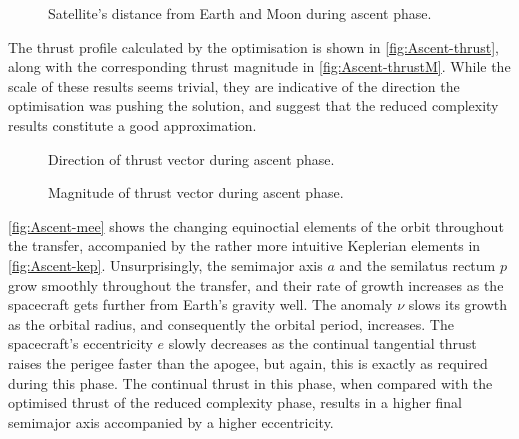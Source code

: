 \begin{figure}
\centering
\def\svgwidth{\figurewidth}

\caption{Satellite's distance from Earth and Moon during ascent phase.} \label{fig:Ascent-dist}
\end{figure}

%
%

The thrust profile calculated by the optimisation is shown in \autoref{fig:Ascent-thrust}, along with the corresponding thrust magnitude in \autoref{fig:Ascent-thrustM}. While the scale of these results seems trivial, they are indicative of the direction the optimisation was pushing the solution, and suggest that the reduced complexity results constitute a good approximation. 

\begin{figure}
\centering
\def\svgwidth{\figurewidth}

\caption{Direction of thrust vector during ascent phase.} \label{fig:Ascent-thrust}
\end{figure}

\begin{figure}
\centering
\def\svgwidth{\figurewidth}

\caption{Magnitude of thrust vector during ascent phase.} \label{fig:Ascent-thrustM}
\end{figure}

\autoref{fig:Ascent-mee} shows the changing equinoctial elements of the orbit throughout the transfer, accompanied by the rather more intuitive Keplerian elements in \autoref{fig:Ascent-kep}. Unsurprisingly, the semimajor axis $a$ and the semilatus rectum $p$ grow smoothly throughout the transfer, and their rate of growth increases as the spacecraft gets further from Earth's gravity well. The anomaly $\nu$ slows its growth as the orbital radius, and consequently the orbital period, increases. The spacecraft's eccentricity $e$ slowly decreases as the continual tangential thrust raises the perigee faster than the apogee, but again, this is exactly as required during this phase. The continual thrust in this phase, when compared with the optimised thrust of the reduced complexity phase, results in a higher final semimajor axis accompanied by a higher eccentricity.

